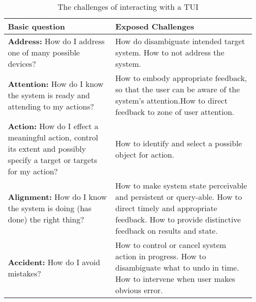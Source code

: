 \begin{table}[H]
	\centering
	\begin{tabular}{| p{6.0cm} | p{7.0cm} |}
	\hline
	\textbf{Basic question} & \textbf{Exposed Challenges} \\
	\hline
	\textbf{Address:} How do I address one of many possible devices? & How do disambiguate intended target system. \newline How to not address the system. \\ 
	\hline
	\textbf{Attention:} How do I know the system is ready and attending to my actions? & How to embody appropriate feedback, so that the user can be aware of the system's attention.\newline How to direct feedback to zone of user attention. \\
	\hline
	\textbf{Action:} How do I effect a meaningful action, control its extent and possibly specify a target or targets for my action? & How to identify and select a possible object for action. \\
	\hline
	\textbf{Alignment:} How do I know the system is doing (has done) the right thing? & How to make system state perceivable and persistent or query-able. \newline How to direct timely and appropriate feedback. \newline How to provide distinctive feedback on results and state. \\ 
	\hline 
	\textbf{Accident:} How do I avoid mistakes? & How to control or cancel system action in progress. \newline How to disambiguate what to undo in time. \newline How to intervene when user makes obvious error. \\
	\hline
	\end{tabular}
	\caption{The challenges of interacting with a TUI\cite{bellotti2002making}}
	\label{tab:tuichallenges}
\end{table}
